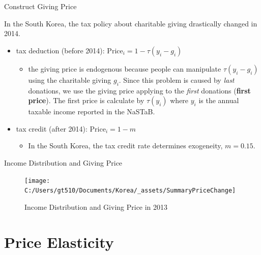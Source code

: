 \documentclass[
  ignorenonframetext,
]{beamer}
\providecommand{\tightlist}{%
  \setlength{\itemsep}{0pt}\setlength{\parskip}{0pt}}
\begin{document}
\begin{frame}{Construct Giving Price}
\protect\hypertarget{construct-giving-price}{}

In the South Korea, the tax policy about charitable giving drastically
changed in 2014.

\begin{itemize}
\tightlist
\item
  tax deduction (before 2014): \(\text{Price}_i = 1 - \tau(y_i - g_i)\)

  \begin{itemize}
  \tightlist
  \item
    the giving price is endogenous because people can manipulate
    \(\tau(y_i - g_i)\) using the charitable giving \(g_i\). Since this
    problem is caused by \emph{last} donations, we use the giving price
    applying to the \emph{first} donations (\textbf{first price}). The
    first price is calculate by \(\tau(y_i)\) where \(y_i\) is the
    annual taxable income reported in the NaSTaB.
  \end{itemize}
\item
  tax credit (after 2014): \(\text{Price}_i = 1 - m\)

  \begin{itemize}
  \tightlist
  \item
    In the South Korea, the tax credit rate determines exogeneity,
    \(m = 0.15\).
  \end{itemize}
\end{itemize}

\end{frame}

\begin{frame}{Income Distribution and Giving Price}
\protect\hypertarget{income-distribution-and-giving-price}{}

\begin{figure}
\texttt{[image: C:/Users/gt510/Documents/Korea/\_assets/SummaryPriceChange]} \caption{Income Distribution and Giving Price in 2013}\label{fig:unnamed-chunk-2}
\end{figure}

\end{frame}

\hypertarget{price-elasticity}{%
\section{Price Elasticity}\label{price-elasticity}}
\end{document}
